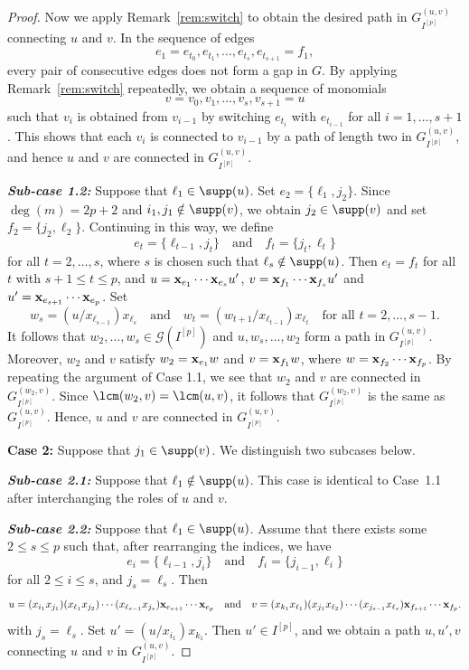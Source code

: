 \documentclass[12pt]{amsart}
\begin{document}
\begin{proof}
Now we apply Remark~\ref{rem:switch} to obtain the desired path in $G_{I^{[p]}}^{(u,v)}$ connecting $u$ and $v$. 
In the sequence of edges 
\[
e_1 = e_{t_0}, e_{t_1}, \ldots, e_{t_s}, e_{t_{s+1}} = f_1,
\]
every pair of consecutive edges does not form a gap in $G$. 
By applying Remark~\ref{rem:switch} repeatedly, we obtain a sequence of monomials 
\[
v = v_0, v_1, \ldots, v_s, v_{s+1} = u
\]
such that $v_i$ is obtained from $v_{i-1}$ by switching $e_{t_i}$ with $e_{t_{i-1}}$ for all $i = 1, \ldots, s + 1$. 
This shows that each $v_i$ is connected to $v_{i-1}$ by a path of length two in $G_{I^{[p]}}^{(u,v)}$, and hence $u$ and $v$ are connected in $G_{I^{[p]}}^{(u,v)}$.

\vspace{0.2cm}

\textit{\textbf{ Sub-case 1.2:}}  Suppose that $\ell_1 \in \supp(u)$. 
Set $e_2 = \{\ell_1, j_2\}$. 
Since $\deg(m) = 2p + 2$ and $i_1, j_1 \notin \supp(v)$, we obtain $j_2 \in \supp(v)$ and set $f_2 = \{j_2, \ell_2\}$. 
Continuing in this way, we define 
\[
e_t = \{\ell_{t-1}, j_t\} \quad \text{and} \quad f_t = \{j_t, \ell_t\}
\]
for all $t = 2, \ldots, s$, where $s$ is chosen such that $\ell_s \notin \supp(u)$. 
Then $e_t = f_t$ for all $t$ with $s + 1 \le t \le p$, and $u={\bf x}_{e_1} \cdots {\bf x}_{e_s} u'$, $v={\bf x}_{f_1} \cdots {\bf x}_{f_s} u'$ and $u'={\bf x}_{e_{s+1}} \cdots {\bf x}_{e_p}$. Set 
\[
w_s = (u/x_{\ell_{s-1}})x_{\ell_s}
\quad \text{and} \quad
w_t = (w_{t+1}/x_{\ell_{t-1}})x_{\ell_t}
\quad \text{for all } t = 2, \ldots, s-1.
\]
It follows that $w_2, \ldots, w_s \in \mathcal{G}(I^{[p]})$ and $u, w_s, \ldots, w_2$ form a path in $G_{I^{[p]}}^{(u,v)}$. Moreover, $w_2$ and $v$ satisfy $w_2 = {\bf x}_{e_1} w$ and $v = {\bf x}_{f_1} w$, 
where $w = {\bf x}_{f_2} \cdots {\bf x}_{f_p}$. 
By repeating the argument of Case 1.1, we see that $w_2$ and $v$ are connected in $G_{I^{[p]}}^{(w_2,v)}$. 
Since $\lcm(w_2, v) = \lcm(u, v)$, it follows that $G_{I^{[p]}}^{(w_2,v)}$ is the same as $G_{I^{[p]}}^{(u,v)}$. 
Hence, $u$ and $v$ are connected in $G_{I^{[p]}}^{(u,v)}$.

\medskip
\noindent
{\bf Case 2:} Suppose that $j_1 \in \supp(v)$. 
We distinguish two subcases below.

\medskip
\noindent
\textit{\textbf{ Sub-case 2.1:}}  Suppose that $\ell_1 \notin \supp(u)$. 
This case is identical to Case~1.1 after interchanging the roles of $u$ and $v$.

\medskip
\noindent
\textit{\textbf{ Sub-case 2.2:}} Suppose that $\ell_1 \in \supp(u)$. 
Assume that there exists some $2 \le s \le p$ such that, after rearranging the indices, we have 
\[
e_i = \{\ell_{i-1}, j_i\} \quad \text{and} \quad f_i = \{j_{i-1}, \ell_i\}
\]
for all $2 \le i \le s$, and $j_s = \ell_s$. Then 
\[
u = (x_{i_1}x_{j_1})(x_{\ell_1}x_{j_2}) \cdots (x_{\ell_{s-1}}x_{j_s}){\bf x}_{e_{s+1}} \cdots {\bf x}_{e_p}
\quad \text{and} \quad
v = (x_{k_1}x_{\ell_1})(x_{j_1}x_{\ell_2}) \cdots (x_{j_{s-1}}x_{\ell_s}){\bf x}_{f_{s+1}} \cdots {\bf x}_{f_p}.
\]
with $j_s = \ell_s$. Set $u' = (u/x_{i_1})x_{k_1}$. 
Then $u' \in I^{[p]}$, and we obtain a path $u, u', v$ connecting $u$ and $v$ in $G_{I^{[p]}}^{(u,v)}$.


\end{proof}
\end{document}
